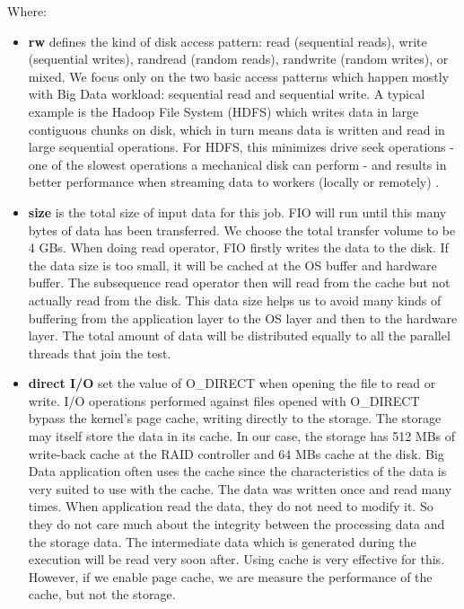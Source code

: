 \documentclass{acmsig}
\begin{document}
Where:
\begin{itemize}
  \item \textbf{rw} defines the kind of disk access pattern: read (sequential reads), write (sequential writes), randread (random reads), randwrite (random writes), or mixed. We focus only on the two basic access patterns which happen mostly with Big Data workload: sequential read and sequential write. A typical example is the Hadoop File System (HDFS) which writes data in large contiguous chunks on disk, which in turn means data is written and read in large sequential operations. For HDFS, this minimizes drive seek operations - one of the slowest operations a mechanical disk can perform - and results in better performance when streaming data to workers (locally or remotely) \cite[Chapter~2]{HadoopOperationsBook}.
 \item \textbf{size} is the total size of input data for this job. FIO will run until this many bytes of data has been transferred. We choose the total transfer volume to be 4 GBs. When doing read operator, FIO firstly writes the data to the disk. If the data size is too small, it will be cached at the OS buffer and hardware buffer. The subsequence read operator then will read from the cache but not actually read from the disk. This data size helps us to avoid many kinds of buffering from the application layer to the OS layer and then to the hardware layer. The total amount of data will be distributed equally to all the parallel threads that join the test.
  \item \textbf{direct I/O} set the value of O\_DIRECT when opening the file to read or write. I/O operations performed against files opened with O\_DIRECT bypass the kernel's page cache, writing directly to the storage. The storage may itself store the data in its cache. In our case, the storage has 512 MBs of write-back cache at the RAID controller and 64 MBs cache at the disk. Big Data application often uses the cache since the characteristics of the data is very suited to use with the cache. The data was written once and read many times. When application read the data, they do not need to modify it. So they do not care much about the integrity between the processing data and the storage data. The intermediate data which is generated during the execution will be read very soon after. Using cache is very effective for this. However, if we enable page cache, we are measure the performance of the cache, but not the storage.

\end{itemize}
\end{document}
